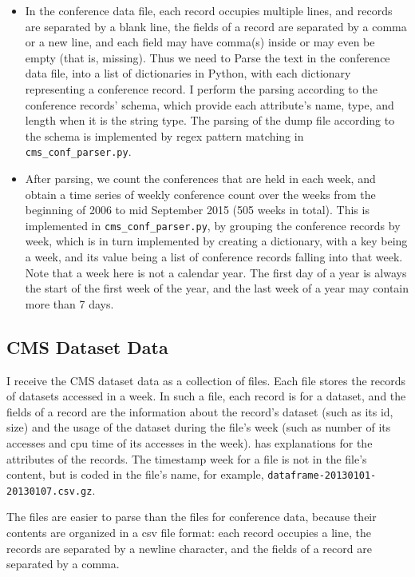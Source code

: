 \documentclass[preprint, 12pt]{elsarticle}
\begin{document}
\begin{itemize}
  
\item In the conference data file, each record occupies multiple lines, and records are separated by a blank line, the fields of a record are separated by a comma or a new line, and each field may have comma(s) inside or may even be empty (that is, missing).
Thus we need to  Parse the text in the conference data file, into a list of dictionaries in Python, with each dictionary representing a conference record.
I perform the parsing according to the conference records' schema, which provide each attribute's name, type, and length when it is the string type.
The parsing of the dump file according to the schema is implemented by regex pattern matching in \verb|cms_conf_parser.py|.

\item After parsing, we count the conferences that are held in each week, and obtain a time series of weekly conference count over the weeks from the beginning of 2006 to mid September 2015 (505 weeks in total).  
This is implemented in \verb|cms_conf_parser.py|, by grouping the conference records by week, which is in turn implemented by creating a dictionary, with a key being a week, and its value being a list of conference records falling into that week.
Note that a week here is not a calendar year. The first day of a year is always the start of the first week of the year, and the last week of a year may contain more than 7 days.

\end{itemize}


\subsection{CMS Dataset Data}

I receive the CMS dataset data as a collection of files.
Each file stores the records of datasets accessed in a week. In such a file, each record is for a dataset, and the fields of a record are the information about the record's dataset (such as its id, size) and the usage of the dataset during the file's week (such as number of its accesses and cpu time of its accesses in the week). \cite{web:vk} has explanations for the attributes of the records.
The timestamp week for a file is not in the file's content, but is coded in the file's name, for example, \verb|dataframe-20130101-20130107.csv.gz|.

The files are easier to parse  than the files for conference data, because their contents are organized in a csv file format: 
each record occupies a line, the records are separated by a newline character, and the fields of a record are separated by a comma.
\end{document}
